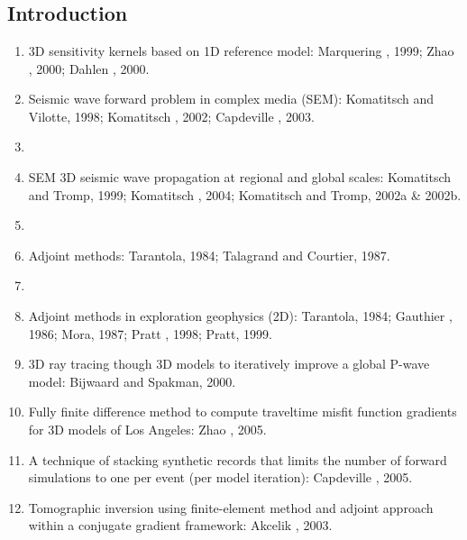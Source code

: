 \renewcommand{\pmk}{Tape\_2007\_GJI\_Adjoint tomography 2D}
\renewcommand{\prf}{FWI/\pmk.pdf}
\renewcommand{\pti}{Finite-frequency tomography using adjoint methods --
Methodology and examples using membrane surface waves}
\renewcommand{\pay}{Carl Tape, Qinya Liu and Jeroen Tromp, 2007}
\renewcommand{\pjo}{Geophys. J. Int.}
\renewcommand{\pda}{2017/1/30 Mon.}

\section{\pinfo}
\subsection{Introduction}
\begin{enumerate}[\hspace{10mm*}]
  \item 3D \Frechet sensitivity kernels based on 1D reference model:
    Marquering \etal, 1999; Zhao \etal, 2000; Dahlen \etal, 2000.
  \item Seismic wave forward problem in complex media (SEM):
    Komatitsch and Vilotte, 1998; Komatitsch \etal, 2002; Capdeville \etal, 2003.
  \item \sline
  \item SEM 3D seismic wave propagation at regional and global scales:
    Komatitsch and Tromp, 1999; Komatitsch \etal, 2004; Komatitsch and Tromp, 2002a \& 2002b.
  \item \sline
  \item Adjoint methods: Tarantola, 1984; Talagrand and Courtier, 1987.
  \item \sline
  \item Adjoint methods in exploration geophysics (2D):
    Tarantola, 1984; Gauthier \etal, 1986; Mora, 1987; Pratt \etal, 1998; Pratt, 1999.
  \item 3D ray tracing though 3D models to iteratively improve a global P-wave model:
    Bijwaard and Spakman, 2000.
  \item Fully finite difference method to compute traveltime misfit function gradients
    for 3D models of Los Angeles: Zhao \etal, 2005.
  \item A technique of stacking synthetic records
    that limits the number of forward simulations to one per event (per model iteration):
    Capdeville \etal, 2005.
  \item Tomographic inversion using finite-element method and adjoint approach
    within a conjugate gradient framework: Akcelik \etal, 2003.

\end{enumerate}
